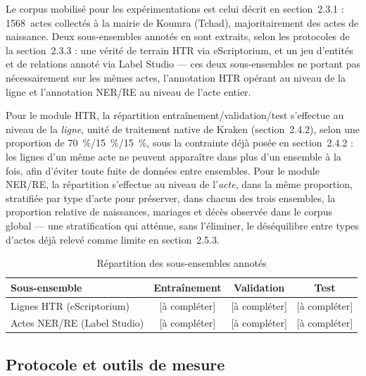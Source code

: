 Le corpus mobilisé pour les expérimentations est celui décrit en section~2.3.1 :
1568~actes collectés à la mairie de Koumra (Tchad), majoritairement des actes de
naissance. Deux sous-ensembles annotés en sont extraits, selon les protocoles de
la section~2.3.3 : une vérité de terrain HTR via eScriptorium, et un jeu d'entités
et de relations annoté via Label Studio --- ces deux sous-ensembles ne portant pas
nécessairement sur les mêmes actes, l'annotation HTR opérant au niveau de la ligne
et l'annotation NER/RE au niveau de l'acte entier.

Pour le module HTR, la répartition entraînement/validation/test s'effectue au
niveau de la \emph{ligne}, unité de traitement native de Kraken (section~2.4.2),
selon une proportion de 70~\%/15~\%/15~\%, sous la contrainte déjà posée en
section~2.4.2 : les lignes d'un même acte ne peuvent apparaître dans plus d'un
ensemble à la fois, afin d'éviter toute fuite de données entre ensembles. Pour le
module NER/RE, la répartition s'effectue au niveau de l'\emph{acte}, dans la même
proportion, stratifiée par type d'acte pour préserver, dans chacun des trois
ensembles, la proportion relative de naissances, mariages et décès observée dans
le corpus global --- une stratification qui atténue, sans l'éliminer, le
déséquilibre entre types d'actes déjà relevé comme limite en section~2.5.3.

\begin{table}[H]
    \centering
    \small
    \caption{Répartition des sous-ensembles annotés}
    \label{tab:repartition-ensembles}
    \begin{tabular}{lccc}
        \toprule
        \textbf{Sous-ensemble}      & \textbf{Entraînement} & \textbf{Validation} & \textbf{Test} \\
        \midrule
        Lignes HTR (eScriptorium)   & [à compléter]         & [à compléter]       & [à compléter] \\
        Actes NER/RE (Label Studio) & [à compléter]         & [à compléter]       & [à compléter] \\
        \bottomrule
    \end{tabular}
\end{table}

\subsection{Protocole et outils de mesure}

